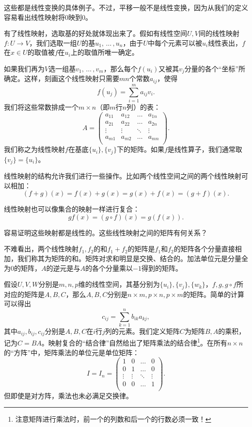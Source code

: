 这些都是线性变换的具体例子。不过，平移一般不是线性变换，因为从我们的定义容易看出线性映射将$0$映到$0$。

有了线性映射，选取基的好处就体现出来了。假如有线性空间$U,V$间的线性映射$f:U\to V$，我们选取一组$U$的基$u_1,\,\dots\,,u_n$，由于$U$中每个元素可以被$u_i$线性表出，$f$在$x\in U$的取值被$f$在$u_i$上的取值所唯一确定。

如果我们再为$V$选一组基$v_1,\,\dots\,,v_m$，那么每个$f(u_i)$又被其$v_j$分量的各个“坐标”所确定。这样，刻画这个线性映射只需要$mn$个常数$a_{ij}$，使得
\[f(u_j)=\sum_{i=1}^ma_{ij}v_i.\]
我们将这些常数排成一个$m\times n$（即$m$行$n$列）的表：
\[ A =
    \begin{pmatrix}
        a_{11} & a_{12} & \ldots & a_{1n} \\
        a_{21} & a_{22} & \ldots & a_{2n} \\
        \vdots & \vdots & \ddots & \vdots \\
        a_{m1} & a_{m2} & \ldots & a_{mn} \\
    \end{pmatrix} . \]
我们称之为线性映射$f$在基底$\{u_i\},\{v_j\}$下的矩阵。如果$f$是线性算子，我们通常取$\{v_j\}=\{u_i\}$。

线性映射的结构允许我们进行一些操作。比如两个线性空间之间的两个线性映射可以相加：\[(f+g)(x)=f(x)+g(x)=g(x)+f(x)=(g+f)(x).\]

线性映射也可以像集合的映射一样进行复合：
\[gf(x)=(g\circ f)(x)=g(f(x)).\]

容易证明这些映射都是线性的。这些线性映射之间的矩阵有何关系？

不难看出，两个线性映射$f_1,f_2$的和$f_1+f_2$的矩阵是$f_1$和$f_2$的矩阵各个分量直接相加，我们称其为矩阵的和。矩阵对求和明显是交换、结合的。加法单位元是分量全为$0$的矩阵，$A$的逆元是与$A$的各个分量乘以$-1$得到的矩阵。

假设$U,V,W$分别是$m,n,p$维的线性空间，其基分别为$\{u_i\},\{v_j\},\{w_k\}$，$f,g,g\circ f$所对应的矩阵是$A,B,C$，那么$A,B,C$分别是$n\times m,p\times n,p\times m$的矩阵。简单的计算可以得出
\[c_{ij}=\sum_{k=1}^nb_{ik}a_{kj},\]
其中$a_{ij},b_{ij},c_{ij}$分别是$A,B,C$在$i$行$j$列的元素。我们定义矩阵$C$为矩阵$B,A$的乘积，记为$C=BA$。映射复合的“结合律”自然给出了矩阵乘法的结合律\footnote{注意矩阵进行乘法时，前一个的列数和后一个的行数必须一致！}。在所有$n\times n$的“方阵”中，矩阵乘法的单位元是单位矩阵：
\[I=I_n=\begin{pmatrix}
        1      & 0      & \ldots & 0      \\
        0      & 1      & \ldots & 0      \\
        \vdots & \vdots & \ddots & \vdots \\
        0      & 0      & \ldots & 1      \\\end{pmatrix}.\]
但即使是对方阵，乘法也未必满足交换律。

